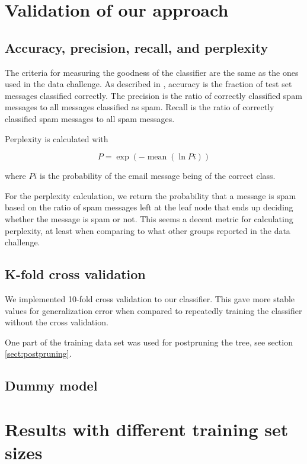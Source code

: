 \documentclass[a4paper,10pt]{article}
\begin{document}
\section{Validation of our approach}

\subsection{Accuracy, precision, recall, and perplexity}

The criteria for measuring the goodness of the classifier are the same
as the ones used in the data challenge.  As described in
\cite{termproject}, accuracy is the fraction of test set messages
classified correctly.  The precision is the ratio of correctly
classified spam messages to all messages classified as spam.  Recall is
the ratio of correctly classified spam messages to all spam messages.

Perplexity is calculated with

\begin{equation}
P = \exp(-\operatorname{mean}(\ln{Pi}))
\end{equation}

where $Pi$ is the probability of the email message being of the correct
class.

For the perplexity calculation, we return the probability that a message
is spam based on the ratio of spam messages left at the leaf node that
ends up deciding whether the message is spam or not.  This seems a
decent metric for calculating perplexity, at least when comparing to
what other groups reported in the data challenge.

\subsection{K-fold cross validation}

We implemented 10-fold cross validation to our classifier.  This
gave more stable values for generalization error when compared to
repeatedly training the classifier without the cross validation.

One part of the training data set was used for postpruning the tree, see
section \ref{sect:postpruning}.

\subsection{Dummy model}


\section{Results with different training set sizes}
\end{document}
